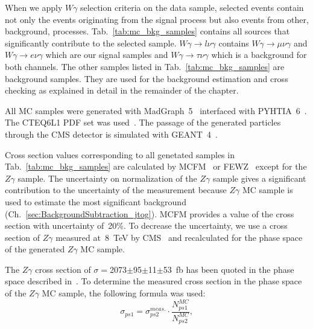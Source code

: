 When we apply $W\gamma$ selection criteria on the data sample, selected events contain not only the events originating from the signal process but also events from other, background, processes. Tab.~\ref{tab:mc_bkg_samples} contains all sources that significantly contribute to the selected sample. $W\gamma \rightarrow l\nu\gamma$ contains $W\gamma \rightarrow \mu\nu\gamma$ and $W\gamma \rightarrow e\nu\gamma$ which are our signal samples and $W\gamma \rightarrow \tau\nu\gamma$ which is a background for both channels. The other samples listed in Tab.~\ref{tab:mc_bkg_samples} are background samples. They are used for the background estimation and cross checking as explained in detail in the remainder of the chapter. 

All MC samples were generated with MadGraph~5~\cite{ref_MadGraph} interfaced with PYHTIA~6~\cite{ref_Pythia}. The CTEQ6L1 PDF set was used~\cite{ref_CTEQ6L1}. The passage of the generated particles through the CMS detector is simulated with GEANT~4~\cite{ref_Geant4}. 

Cross section values corresponding to all genetated samples in Tab.~\ref{tab:mc_bkg_samples} are calculated by MCFM~\cite{ref_MCFM} or FEWZ~\cite{ref_FEWZ} except for the $Z\gamma$ sample. The uncertainty on normalization of the $Z\gamma$ sample gives a significant contribution to the uncertainty of the measurement because $Z\gamma$ MC sample is used to estimate the most significant background (Ch.~\ref{sec:BackgroundSubtraction_jtog}). MCFM provides a value of the cross section with uncertainty of~20\%. To decrease the uncertainty, we use a cross section of $Z\gamma$ measured at~8~TeV by CMS~\cite{ref_Zg8TeV} and recalculated for the phase space of the generated $Z\gamma$ MC sample. 

The $Z\gamma$ cross section of $\sigma=$2073$\pm$95$\pm$11$\pm$53~fb has been quoted in the phase space described in~\cite{ref_Zg8TeV}. To determine the measured cross section in the phase space of the $Z\gamma$ MC sample, the following formula was used:
\begin{equation}
\sigma_{ps1} = \sigma_{ps2}^{meas.} \cdot \frac{N_{ps1}^{MC}}{N_{ps2}^{MC}},
\end{equation}

